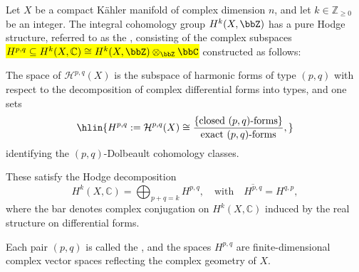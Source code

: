 \begin{definition} \label{definition:hodge_components_of_classical_hodge_structure_on_integral_cohomology_of_complex_algebraic_variety}
Let $X$ be a compact Kähler manifold of complex dimension $n$, and let $k \in \mathbb{Z}_{\geq 0}$ be an integer. The integral cohomology group $H^k(X, \bbZ)$ has a pure Hodge structure, referred to as the , consisting of the complex subspaces \hl{$H^{p,q} \subseteq H^k(X, \mathbb{C}) \cong H^k(X, \bbZ) \otimes_{\bbZ} \bbC$} constructed as follows:


The space of  $\mathcal{H}^{p,q}(X)$ is the subspace of harmonic forms of type $(p,q)$ with respect to the decomposition of complex differential forms into types,
and one sets
$$ \hlin{ H^{p,q} := \mathcal{H}^{p,q}(X) \cong \frac{\{\text{closed }(p,q)\text{-forms}\}}{\text{exact }(p,q)\text{-forms}}, } $$
identifying the $(p,q)$-Dolbeault cohomology classes.

These satisfy the Hodge decomposition
$$ H^k(X, \mathbb{C}) = \bigoplus_{p+q=k} H^{p,q}, \quad \text{with} \quad \overline{H^{p,q}} = H^{q,p}, $$
where the bar denotes complex conjugation on $H^k(X, \mathbb{C})$ induced by the real structure on differential forms.

Each pair $(p,q)$ is called the , and the spaces $H^{p,q}$ are finite-dimensional complex vector spaces reflecting the complex geometry of $X$.
\end{definition}
